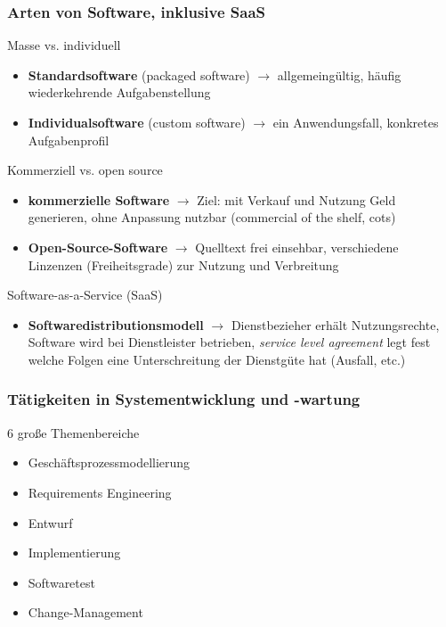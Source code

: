 \subsubsection{Arten von Software, inklusive SaaS}
Masse vs. individuell

\begin{itemize}
  \item \textbf{Standardsoftware} (packaged software) $\rightarrow$ allgemeingültig, häufig wiederkehrende Aufgabenstellung
  \item \textbf{Individualsoftware} (custom software) $\rightarrow$ ein Anwendungsfall, konkretes Aufgabenprofil
\end{itemize}

Kommerziell vs. open source

\begin{itemize}
  \item \textbf{kommerzielle Software} $\rightarrow$ Ziel: mit Verkauf und Nutzung Geld generieren, ohne Anpassung nutzbar (commercial of the shelf, cots)
  \item \textbf{Open-Source-Software} $\rightarrow$ Quelltext frei einsehbar, verschiedene Linzenzen (Freiheitsgrade) zur Nutzung und Verbreitung
\end{itemize}

Software-as-a-Service (SaaS)

\begin{itemize}
  \item \textbf{Softwaredistributionsmodell} $\rightarrow$ Dienstbezieher erhält Nutzungsrechte, Software wird bei Dienstleister betrieben, \textit{service level agreement} legt fest welche Folgen eine Unterschreitung der Dienstgüte hat (Ausfall, etc.)
\end{itemize}

\subsubsection{Tätigkeiten in Systementwicklung und -wartung}
6 große Themenbereiche

\begin{itemize}
  \item Geschäftsprozessmodellierung
  \item Requirements Engineering
  \item Entwurf
  \item Implementierung
  \item Softwaretest
  \item Change-Management
\end{itemize}

